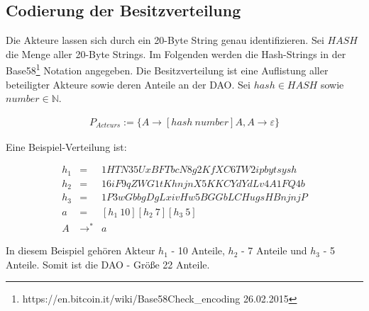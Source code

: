 \documentclass[a4paper,12pt]{report}
\begin{document}
% 
% 
% 
% 


\subsection{Codierung der Besitzverteilung}
Die Akteure lassen sich durch ein 20-Byte String genau identifizieren. Sei $HASH$ die Menge aller 20-Byte Strings. Im Folgenden werden die Hash-Strings in der Base58\footnote{https://en.bitcoin.it/wiki/Base58Check\_encoding 26.02.2015} Notation angegeben. Die Besitzverteilung ist eine Auflistung aller beteiligter Akteure sowie deren Anteile an der DAO.
Sei $hash\in HASH$ sowie $number\in\mathbb{N}$.

\begin{eqnarray}
P_{Acteurs} := \{A\rightarrow[hash\ number]A,A\rightarrow \varepsilon\}
\end{eqnarray}

Eine Beispiel-Verteilung ist: 

\begin{eqnarray}
  h_1 &=& 1HTN35UxBFTbcN8g2KfXC6TW2ipbytsysh\\
  h_2 &=& 16iF9qZWG1tKhnjnX5KKCYdYdLv4A1FQ4b\\
  h_3 &=& 1P3wGbbgDgLxivHw5BGGbLCHugsHBnjnjP\\
  a &=& [h_1\ 10][h_2\ 7][h_3\ 5] \\
  A &\rightarrow^*& a
\end{eqnarray}

In diesem Beispiel gehören Akteur $h_1$ - 10 Anteile, $h_2$ - 7 Anteile und $h_3$ - 5 Anteile. Somit ist die DAO - Größe 22 Anteile.

\end{document}
